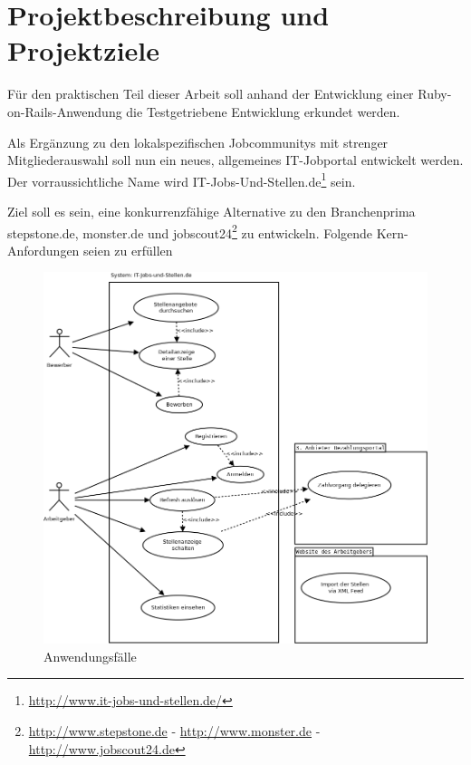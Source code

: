 \section{Projektbeschreibung und Projektziele}
Für den praktischen Teil dieser Arbeit soll anhand der Entwicklung einer Ruby-on-Rails-Anwendung die Testgetriebene Entwicklung erkundet werden.

Als Ergänzung zu den lokalspezifischen Jobcommunitys mit strenger Mitgliederauswahl soll nun ein neues, allgemeines IT-Jobportal entwickelt werden. Der vorraussichtliche Name wird IT-Jobs-Und-Stellen.de\footnote{\url{http://www.it-jobs-und-stellen.de/}} sein.

Ziel soll es sein, eine konkurrenzfähige Alternative zu den Branchenprima stepstone.de, monster.de und jobscout24\footnote{
\url{http://www.stepstone.de} - \url{http://www.monster.de} - \url{http://www.jobscout24.de}} zu entwickeln. Folgende Kern-Anfordungen seien zu erfüllen


\begin{figure}[htbp]
 \centering
 \includegraphics[width=1\textwidth]{./material/usecases.png}
 \caption{Anwendungsfälle}
 \label{fig:usecases}
\end{figure}


